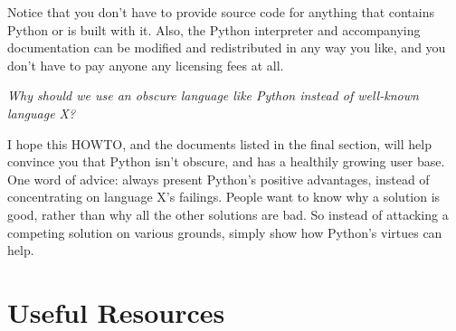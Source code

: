 \documentclass{howto}
\begin{document}
Notice that you don't have to provide source code for anything that
contains Python or is built with it.  Also, the Python interpreter and
accompanying documentation can be modified and redistributed in any
way you like, and you don't have to pay anyone any licensing fees at
all.

\emph{Why should we use an obscure language like Python instead of
well-known language X?}

I hope this HOWTO, and the documents listed in the final section, will
help convince you that Python isn't obscure, and has a healthily
growing user base.  One word of advice: always present Python's
positive advantages, instead of concentrating on language X's
failings.  People want to know why a solution is good, rather than why
all the other solutions are bad.  So instead of attacking a competing
solution on various grounds, simply show how Python's virtues can
help.


\section{Useful Resources}
\end{document}
